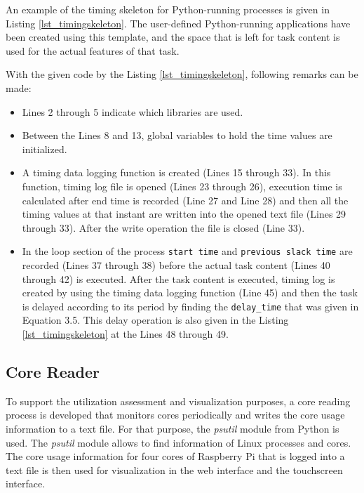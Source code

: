An example of the timing skeleton for Python-running processes is given in Listing \ref{lst_timingskeleton}. The user-defined Python-running applications have been created using this template, and the space that is left for task content is used for the actual features of that task.



With the given code by the Listing \ref{lst_timingskeleton}, following remarks can be made:

\begin{itemize}
	\item Lines 2 through 5 indicate which libraries are used.
	\item Between the Lines 8 and 13, global variables to hold the time values are initialized.
	\item A timing data logging function is created (Lines 15 through 33). In this function, timing log file is opened (Lines 23 through 26), execution time is calculated after end time is recorded (Line 27 and Line 28) and then all the timing values at that instant are written into the opened text file (Lines 29 through 33). After the write operation the file is closed (Line 33).
	\item In the loop section of the process \texttt{start time} and \texttt{previous slack time} are recorded (Lines 37 through 38) before the actual task content (Lines 40 through 42) is executed. After the task content is executed, timing log is created by using the timing data logging function (Line 45) and then the task is delayed according to its period by finding the \texttt{delay\texttt{\_}time} that was given in Equation 3.5. This delay operation is also given in the Listing \ref{lst_timingskeleton} at the Lines 48 through 49.  
\end{itemize}

\subsection{Core Reader}
To support the utilization assessment and visualization purposes, a core reading process is developed that monitors cores periodically and writes the core usage information to a text file. For that purpose, the \textit{psutil} module \cite{psutil} from Python is used. The \textit{psutil} module allows to find information of Linux processes and cores. The core usage information for four cores of Raspberry Pi that is logged into a text file is then used for visualization in the web interface and the touchscreen interface. 

